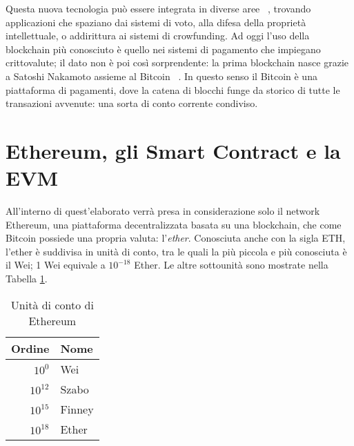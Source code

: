 \indent Questa nuova tecnologia può essere integrata in diverse aree ~\cite{iansiti_lakhani_2017}, trovando applicazioni che spaziano dai sistemi di voto, alla difesa della proprietà intellettuale, o addirittura ai sistemi di crowfunding.\newline
Ad oggi l'uso della blockchain più conosciuto è quello nei sistemi di pagamento che impiegano crittovalute; il dato non è poi così sorprendente: la prima blockchain nasce grazie a Satoshi Nakamoto assieme al Bitcoin ~\cite{nakamoto2008bitcoin}. In questo senso il Bitcoin è una piattaforma di pagamenti, dove la catena di blocchi funge da storico di tutte le transazioni avvenute: una sorta di conto corrente condiviso.\newline




\section{Ethereum, gli Smart Contract e la EVM}

All'interno di quest'elaborato verrà presa in considerazione solo il network Ethereum, una piattaforma decentralizzata basata su una blockchain, che come Bitcoin possiede una propria valuta: l'\textit{ether}. Conosciuta anche con la sigla ETH, l'ether è suddivisa in unità di conto, tra le quali la più piccola e più conosciuta è il Wei; 1 Wei equivale a $10^{-18}$ Ether. Le altre sottounità sono mostrate nella Tabella \ref{tab:eth-units}.

\begin{table}[h]                        
\begin{center}  
\begin{tabular}{rl}
    \hline \hline   %
    Ordine & Nome\\
    \hline  %
    $10^0$ & Wei\\
    $10^{12}$ & Szabo\\
    $10^{15}$ & Finney\\
    $10^{18}$ & Ether\\
    \hline \hline
\end{tabular}
\caption[Unità di conto di Ethereum]{Unità di conto di Ethereum}\label{tab:eth-units}
\end{center}
\end{table}

